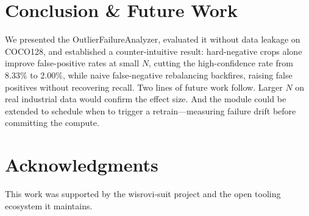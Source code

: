 \documentclass[conference]{IEEEtran}
\begin{document}
\section{Conclusion \& Future Work}
We presented the OutlierFailureAnalyzer, evaluated it without data leakage on
COCO128, and established a counter-intuitive result: hard-negative crops alone
improve false-positive rates at small \(N\), cutting the high-confidence rate
from 8.33\% to 2.00\%, while naive false-negative rebalancing backfires,
raising false positives without recovering recall. Two lines of future work
follow. Larger \(N\) on real industrial data would confirm the effect size.
And the module could be extended to schedule when to trigger a
retrain---measuring failure drift before committing the compute.

\section*{Acknowledgments}
This work was supported by the wisrovi-suit project and the open tooling
ecosystem it maintains.



\end{document}
